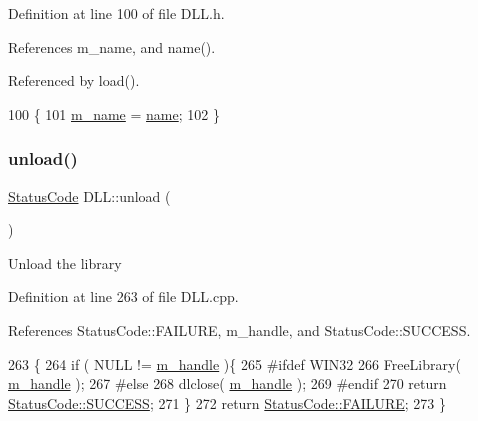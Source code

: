 Definition at line 100 of file D\+L\+L.\+h.



References m\+\_\+name, and name().



Referenced by load().


\begin{DoxyCode}
100                                 \{
101     \hyperlink{classDLL_ad5e4d36d8c2575447f73acc2a703b405}{m\_name} = \hyperlink{classDLL_a0a915d538771dde2cb0580cd340ee088}{name};
102   \}
\end{DoxyCode}
\mbox{\label{classDLL_a10147aebd7b2688354f8c372d468d4aa}} 
\subsubsection{\texorpdfstring{unload()}{unload()}}
{\footnotesize\ttfamily \hyperlink{classStatusCode}{Status\+Code} D\+L\+L\+::unload (\begin{DoxyParamCaption}{ }\end{DoxyParamCaption})}

Unload the library 

Definition at line 263 of file D\+L\+L.\+cpp.



References Status\+Code\+::\+F\+A\+I\+L\+U\+RE, m\+\_\+handle, and Status\+Code\+::\+S\+U\+C\+C\+E\+SS.


\begin{DoxyCode}
263                          \{
264   \textcolor{keywordflow}{if} ( NULL != \hyperlink{classDLL_a2ca22015aef35c5d61f8daaf3c070154}{m\_handle} )\{
265 \textcolor{preprocessor}{#ifdef WIN32
}
266     FreeLibrary( \hyperlink{classDLL_a2ca22015aef35c5d61f8daaf3c070154}{m\_handle} );
267 \textcolor{preprocessor}{#else
}
268     dlclose( \hyperlink{classDLL_a2ca22015aef35c5d61f8daaf3c070154}{m\_handle} );
269 \textcolor{preprocessor}{#endif
}
270     \textcolor{keywordflow}{return} \hyperlink{classStatusCode_a6f565cbeadc76d14c72f047e5e85eb4badd0da38d3ba0d922efd1f4619bc37ad8}{StatusCode::SUCCESS};
271   \}
272   \textcolor{keywordflow}{return} \hyperlink{classStatusCode_a6f565cbeadc76d14c72f047e5e85eb4ba3da73d4c469762eb9d3c960368252b26}{StatusCode::FAILURE};
273 \}
\end{DoxyCode}
\mbox{\label{classDLL_a3b019cc98993af67fdc9b07b1921251b}} 
